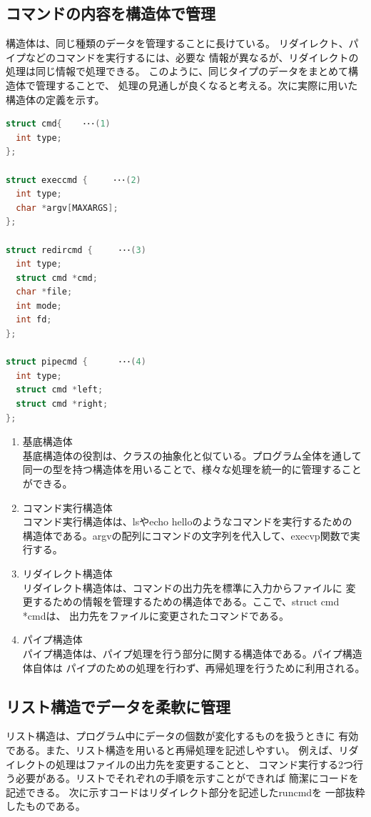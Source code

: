 \documentclass[a4j, twocolumn]{ltjsarticle}
\begin{document}
    \subsection{コマンドの内容を構造体で管理}
      構造体は、同じ種類のデータを管理することに長けている。
      リダイレクト、パイプなどのコマンドを実行するには、必要な
      情報が異なるが、リダイレクトの処理は同じ情報で処理できる。
      このように、同じタイプのデータをまとめて構造体で管理することで、
      処理の見通しが良くなると考える。次に実際に用いた構造体の定義を示す。
      \begin{lstlisting}[language=C,caption=利用した構造体]
struct cmd{    ･･･(1)
  int type;
};

struct execcmd {     ･･･(2)
  int type;
  char *argv[MAXARGS];
};

struct redircmd {     ･･･(3)
  int type;
  struct cmd *cmd;
  char *file;
  int mode;
  int fd;
};

struct pipecmd {      ･･･(4)
  int type;
  struct cmd *left;
  struct cmd *right;
};
      \end{lstlisting}
      \begin{enumerate}
        \item 基底構造体
        \\ \indent 基底構造体の役割は、クラスの抽象化と似ている。プログラム全体を通して
        同一の型を持つ構造体を用いることで、様々な処理を統一的に管理することができる。
        \item コマンド実行構造体
        \\ \indent コマンド実行構造体は、lsやecho helloのようなコマンドを実行するための
        構造体である。argvの配列にコマンドの文字列を代入して、execvp関数で実行する。
        \item  リダイレクト構造体
        \\ \indent リダイレクト構造体は、コマンドの出力先を標準に入力からファイルに
        変更するための情報を管理するための構造体である。ここで、struct cmd *cmdは、
        出力先をファイルに変更されたコマンドである。
        \item  パイプ構造体
        \\ \indent パイプ構造体は、パイプ処理を行う部分に関する構造体である。パイプ構造体自体は
        パイプのための処理を行わず、再帰処理を行うために利用される。
      \end{enumerate}

      \subsection{リスト構造でデータを柔軟に管理}
      リスト構造は、プログラム中にデータの個数が変化するものを扱うときに
      有効である。また、リスト構造を用いると再帰処理を記述しやすい。
      例えば、リダイレクトの処理はファイルの出力先を変更することと、
      コマンド実行する2つ行う必要がある。リストでそれぞれの手順を示すことができれば
      簡潔にコードを記述できる。
      次に示すコードはリダイレクト部分を記述したruncmdを
      一部抜粋したものである。
\end{document}
